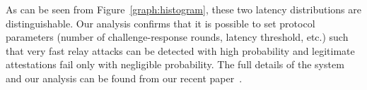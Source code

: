 As can be seen from Figure~\ref{graph:histogram}, these two latency distributions are distinguishable. Our analysis confirms that it is possible to set protocol parameters (number of challenge-response rounds, latency threshold, etc.) such that very fast relay attacks can be detected with high probability and legitimate attestations fail only with negligible probability. The full details of the \proximitee system and our analysis can be found from our recent paper~\cite{proximitee}.





